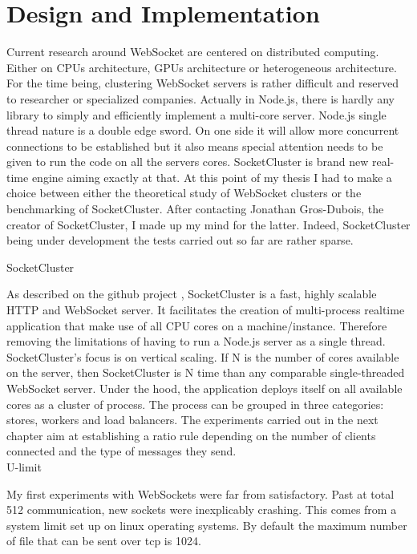 \chapter{Design and Implementation} 
\label{Chapter3} 


Current research around WebSocket are centered on distributed computing. Either
on CPUs architecture, GPUs architecture or heterogeneous architecture. For the
time being, clustering WebSocket servers is rather difficult and reserved to
researcher or specialized companies. Actually in Node.js, there is hardly any
library to simply and efficiently implement a multi-core server.  Node.js
single thread nature is a double edge sword. On one side it will allow more
concurrent connections to be established but it also means special attention
needs to be given to run the code on all the servers cores. SocketCluster is
brand new real-time engine aiming exactly at that.  At this point of my thesis
I had to make a choice between either the theoretical study of WebSocket
clusters or the benchmarking of SocketCluster. After contacting Jonathan
Gros-Dubois, the creator of SocketCluster, I made up my mind for the latter.
Indeed, SocketCluster being under development the tests carried out so far are
rather sparse. 

SocketCluster

As described on the github project  \citep{Reference38}, SocketCluster is a
fast, highly scalable HTTP and WebSocket server. It facilitates the creation of
multi-process realtime application that make use of all CPU cores on a
machine/instance. Therefore removing the limitations of having to run a Node.js
server as a single thread.  SocketCluster's focus is on vertical scaling. If N
is the number of cores available on the server, then SocketCluster is N time
than any comparable single-threaded WebSocket server. Under the hood, the
application deploys itself on all available cores as a cluster of process. The
process can be grouped in three categories: stores, workers and load balancers.
The experiments carried out in the next chapter aim at establishing a ratio
rule depending on the number of clients connected and the type of messages they
send.\\ 

U-limit

My first experiments with WebSockets were far from satisfactory. Past at total
512 communication, new sockets were inexplicably crashing. This comes from a
system limit set up on linux operating systems. By default the maximum number
of file that can be sent over tcp is 1024.\\ 

